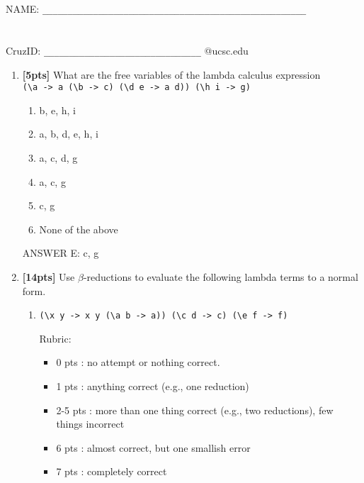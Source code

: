 \documentclass[paper=letter, fontsize=13pt]{article} %
\numberwithin{equation}{section} %
\newif\ifshowanswers\showanswerstrue
\begin{document}
\bigskip
\bigskip
\bigskip
\bigskip
\bigskip
\bigskip
\bigskip
\bigskip
\bigskip
\bigskip
\bigskip
\bigskip
\bigskip
\bigskip
\bigskip
\bigskip
\noindent NAME: \verb|____________________________________________________| \\
\bigskip\\ 
\bigskip\\
CruzID: \verb|_______________________________| @ucsc.edu

\newpage
{}

\bigskip

\begin{enumerate} 
 \item \textbf{[5pts]} What are the free variables of the lambda calculus expression \\
           \verb|(\a -> a (\b -> c) (\d e -> a d)) (\h i -> g)|
          \begin{enumerate}
          \item b, e, h, i
          \item a, b, d, e, h, i
          \item a, c, d, g
          \item a, c, g
          \item c, g
          \item None of the above
          \end{enumerate}

\ifshowanswers
ANSWER E: c, g
\fi

\item \textbf{[14pts]} Use $\beta$-reductions to evaluate the following lambda terms to a normal form. \\
\bigskip
\bigskip
\begin{enumerate}[label=(\Alph*)]
\item 
\verb|(\x y -> x y (\a b -> a)) (\c d -> c) (\e f -> f)|
\ifshowanswers
Rubric:
\begin{itemize}
\item 0 pts : no attempt or nothing correct.
\item 1 pts : anything correct (e.g., one reduction)
\item 2-5 pts : more than one thing correct (e.g., two reductions), few things incorrect
\item 6 pts : almost correct, but one smallish error
\item 7 pts : completely correct
\end{itemize}
\else
\bigskip
\bigskip
\bigskip
\bigskip
\bigskip
\bigskip
\bigskip
\bigskip
\bigskip
\bigskip
\bigskip
\bigskip
\bigskip
\bigskip
\bigskip
\bigskip
\fi


\end{enumerate}
\end{enumerate}
\end{document}
